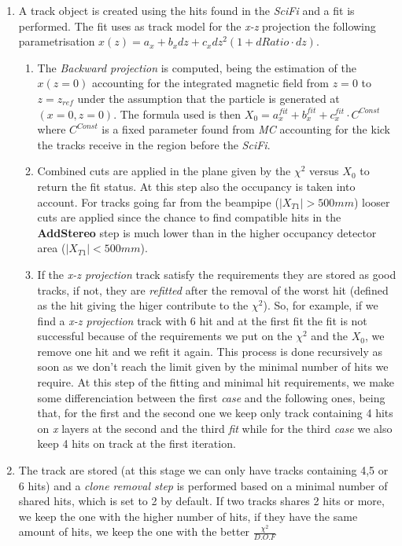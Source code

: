 \documentclass[paper=a4, fontsize=10pt]{scrartcl}
\numberwithin{equation}{section}		%
\numberwithin{figure}{section}			%
\numberwithin{table}{section}				%
\begin{document}
\begin{itemize}
\begin{enumerate}
      \item{A track object is created using the hits found in the \textit{SciFi} and a fit is performed. The fit uses as track model for the \textit{x-z} projection the following parametrisation $x(z)=a_{x}+b_{x}dz+c_{x}dz^{2}(1+dRatio\cdot dz)$.}
        \begin{enumerate}
           \item{The \textit{Backward projection} is computed, being the estimation of the $x(z=0)$ accounting for the integrated magnetic field from $z=0$ to $z=z_{ref}$ under the assumption that the particle is generated at $(x=0,z=0)$. The formula used is then $X_{0} = a^{fit}_{x}+b^{fit}_{x}+c^{fit}_{x} \cdot C^{Const}$ where $C^{Const}$ is a fixed parameter found from \textit{MC} accounting for the kick the tracks receive in the region before the \textit{SciFi}. }
           \item{Combined cuts are applied in the plane given by the $\chi^{2}$ versus $X_{0}$ to return the fit status. At this step also the occupancy is taken into account. For tracks going far from the beampipe ($\left| X_{T1} \right| > 500 mm$) looser cuts are applied since the chance to find compatible hits in the \textbf{AddStereo} step is much lower than in the higher occupancy detector area ($\left| X_{T1} \right| <500 mm$).}
           \item{If the \textit{x-z projection} track satisfy the requirements they are stored as good tracks, if not, they are \textit{refitted} after the removal of the worst hit (defined as the hit giving the higer contribute to the $\chi^{2}$). So, for example, if we find a \textit{x-z projection} track with 6 hit and at the first fit the fit is not successful because of the requirements we put on the $\chi^{2}$ and the $X_{0}$, we remove one hit and we refit it again. This process is done recursively as soon as we don't reach the limit given by the minimal number of hits we require. At this step of the fitting and minimal hit requirements, we make some differenciation between the first \textit{case} and the following ones, being that, for the first and the second one we keep only track containing 4 hits on \textit{x} layers at the second and the third \textit{fit} while for the third \textit{case} we also keep 4 hits on track at the first iteration.}
        \end{enumerate}
      \item{The track are stored (at this stage we can only have tracks containing 4,5 or 6 hits) and a \textit{clone removal step} is performed based on a minimal number of shared hits, which is set to 2 by default. If two tracks shares 2 hits or more, we keep the one with the higher number of hits, if they have the same amount of hits, we keep the one with the better $\frac{\chi^{2}}{D.O.F}$}

\end{enumerate}
\end{itemize}
\end{document}

